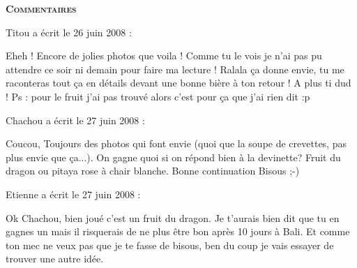 \bigskip
\textbf{\textsc{Commentaires}}

\medskip
Titou a écrit le 26 juin 2008 :
\begin{displayquote}
Eheh ! Encore de jolies photos que voila ! Comme tu le vois je n'ai pas pu attendre ce soir ni demain pour faire ma lecture !
Ralala ça donne envie, tu me raconteras tout ça en détails devant une bonne bière à ton retour !
A plus ti dud !
Ps : pour le fruit j'ai pas trouvé alors c'est pour ça que j'ai rien dit :p
\end{displayquote}

\medskip
Chachou a écrit le 27 juin 2008 :
\begin{displayquote}
Coucou,
Toujours des photos qui font envie (quoi que la soupe de crevettes, pas plus envie que ça...).
On gagne quoi si on répond bien à la devinette?
Fruit du dragon ou pitaya rose à chair blanche.
Bonne continuation
Bisous ;-)
\end{displayquote}

\medskip
Etienne a écrit le 27 juin 2008 :
\begin{displayquote}
Ok Chachou, bien joué c'est un fruit du dragon. Je t'aurais bien dit que tu en gagnes un mais il risquerais de ne plus être bon après 10 jours à Bali. Et comme ton mec ne veux pas que je te fasse de bisous, ben du coup je vais essayer de trouver une autre idée.
\end{displayquote}

\vfill
